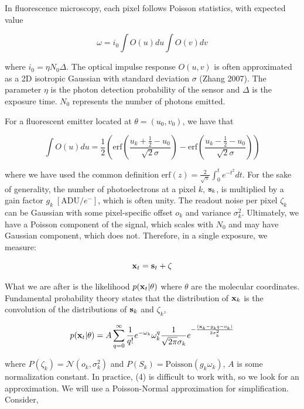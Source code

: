 \documentclass{article}
\begin{document}
In fluorescence microscopy, each pixel follows Poisson statistics, with expected value

\begin{equation}
\omega = i_{0}\int O(u)du\int O(v)dv
\end{equation}

where $i_{0} = \eta N_{0}\Delta$. The optical impulse response $O(u,v)$ is often approximated as a 2D isotropic Gaussian with standard deviation $\sigma$ (Zhang 2007). The parameter $\eta$ is the photon detection probability of the sensor and $\Delta$ is the exposure time. $N_{0}$ represents the number of photons emitted.

For a fluorescent emitter located at $\theta = (u_{0},v_{0})$, we have that

\begin{equation}
\int O(u)du = \frac{1}{2}\left(\mathrm{erf}\left(\frac{u_{k}+\frac{1}{2}-u_{0}}{\sqrt{2}\sigma}\right) -\mathrm{erf}\left(\frac{u_{k}-\frac{1}{2}-u_{0}}{\sqrt{2}\sigma}\right)\right)
\end{equation}

where we have used the common definition $\mathrm{erf}(z) = \frac{2}{\sqrt{\pi}}\int_{0}^{t}e^{-t^{2}}dt$. For the sake of generality, the number of photoelectrons at a pixel $k$, $\bold{s}_k$, is  multiplied by a gain factor $g_k \;[\mathrm{ADU}/e^{-}]$, which is often unity. The readout noise per pixel $\zeta_{k}$ can be Gaussian with some pixel-specific offset $o_{k}$ and variance $\sigma_{k}^{2}$. Ultimately, we have a Poisson component of the signal, which scales with $N_{0}$ and may have Gaussian component, which does not. Therefore, in a single exposure, we measure: 

\begin{equation}
\bold{x}_t = \bold{s}_t + \bold{\zeta}
\end{equation}

What we are after is the likelihood $p(\bold{x}_{t}|\theta)$ where $\theta$ are the molecular coordinates. Fundamental probability theory states that the distribution of $\bold{x}_{k}$ is the convolution of the distributions of $\bold{s}_{k}$ and $\zeta_{k}$,

\begin{equation}
p(\bold{x}_{t}|\theta) = A\sum_{q=0}^{\infty} \frac{1}{q!}e^{-\omega_{k}}\omega_{k}^{q}\frac{1}{\sqrt{2\pi}\sigma_{k}}e^{-\frac{(\bold{x}_{k}-g_{k}q-o_{k})}{2\sigma_{k}^{2}}}
\end{equation}

where $P(\zeta_{k}) = \mathcal{N}(o_{k},\sigma_{k}^{2})$ and $P(S_{k}) = \mathrm{Poisson}(g_{k}\omega_{k})$,  $A$ is some normalization constant. In practice, (4) is difficult to work with, so we look for an approximation. We will use a Poisson-Normal approximation for simplification. Consider,
\end{document}

